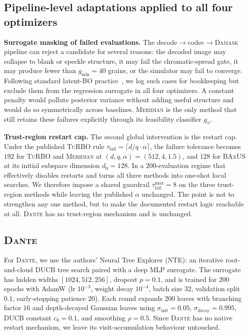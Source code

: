\documentclass{article}
\newcommand{\meridian}{\textsc{Meridian}}
\newcommand{\dante}{\textsc{Dante}}
\newcommand{\turbo}{\textsc{TuRBO}}
\newcommand{\baxus}{\textsc{BAxUS}}
\newcommand{\damask}{\textsc{Damask}}
\begin{document}
\subsection{Pipeline-level adaptations applied to all four optimizers}

\textbf{Surrogate masking of failed evaluations.}
The decode$\to$codec$\to$\damask{} pipeline can reject a candidate for several reasons: the decoded image may collapse to blank or speckle structure, it may fail the chromatic-spread gate, it may produce fewer than $g_{\min}{=}40$ grains, or the simulator may fail to converge. Following standard latent-BO practice~\citep{eriksson2019,papenmeier2022}, we log such cases for bookkeeping but exclude them from the regression surrogate in all four optimizers. A constant penalty would pollute posterior variance without adding useful structure and would do so symmetrically across baselines. \meridian{} is the only method that still retains these failures explicitly through its feasibility classifier $g_\psi$.

\textbf{Trust-region restart cap.}
The second global intervention is the restart cap. Under the published \turbo{} rule $\tau_{\mathrm{fail}}=\lceil d/q \cdot \alpha \rceil$, the failure tolerance becomes $192$ for \turbo{} and \meridian{} at $(d,q,\alpha)=(512,4,1.5)$, and $128$ for \baxus{} at its initial subspace dimension $d_0=128$. In a $200$-evaluation regime that effectively disables restarts and turns all three methods into one-shot local searches. We therefore impose a shared guardrail $\tau_{\mathrm{fail}}^{\max}=8$ on the three trust-region methods while leaving the published $\alpha$ unchanged. The point is not to strengthen any one method, but to make the documented restart logic reachable at all. \dante{} has no trust-region mechanism and is unchanged.

\subsection{\dante{}~\citep{wei2025}}

For \dante{}, we use the authors' Neural Tree Explorer (NTE): an iterative root-and-cloud DUCB tree search paired with a deep MLP surrogate. The surrogate has hidden widths $[1024,512,256]$, dropout $p=0.1$, and is trained for $200$ epochs with AdamW (lr $10^{-3}$, weight decay $10^{-4}$, batch size $32$, validation split $0.1$, early-stopping patience $20$). Each round expands $200$ leaves with branching factor $16$ and depth-decayed Gaussian leaves using $\sigma_{\mathrm{init}}=0.05$, $\sigma_{\mathrm{decay}}=0.995$, DUCB constant $c_0=0.1$, and smoothing $\rho=0.5$. Since \dante{} has no native restart mechanism, we leave its visit-accumulation behaviour untouched.
\end{document}

